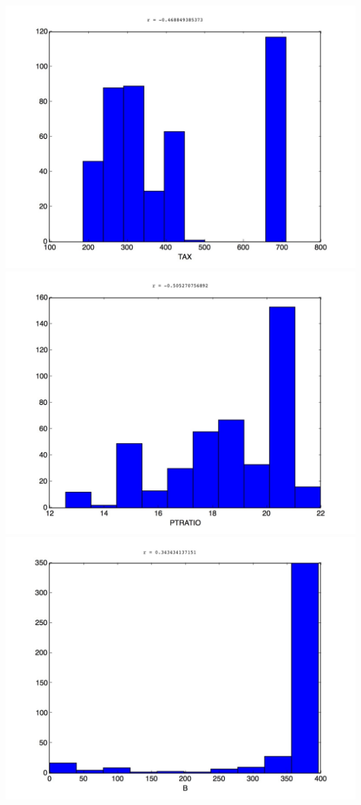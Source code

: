 \documentclass[]{report}
\begin{document}
\begin{center}
			\includegraphics[scale=0.2]{hist_9}\\
			\includegraphics[scale=0.2]{hist_10}\\
			\includegraphics[scale=0.2]{hist_11}\\

\end{center}
\end{document}
